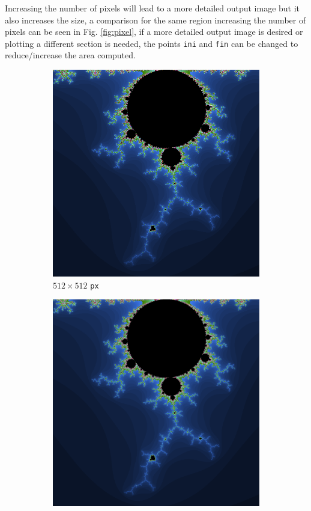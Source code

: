 \documentclass{article}
\begin{document}
Increasing the number of pixels will lead to a more detailed output image but
it also increases the size, a comparison for the same region increasing the
number of pixels can be seen in Fig. \ref{fig:pixel}, if a more detailed output
image is desired or plotting a different section is needed, the points
\verb|ini| and \verb|fin| can be changed to reduce/increase the area computed. 

\begin{figure}[h!]
  \centering
  \begin{subfigure}[t]{0.3\linewidth}
    \includegraphics[width=1.0\textwidth]{mb_512.png}
    \caption{$512\times 512$ \texttt{px}}
  \end{subfigure}
  \begin{subfigure}[t]{0.3\linewidth}
    \includegraphics[width=1.0\textwidth]{mb_1024.png}

\end{subfigure}
\end{figure}
\end{document}

